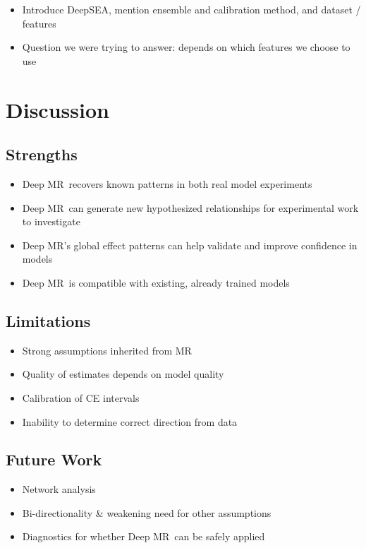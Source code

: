 \documentclass[twoside,11pt]{article}
\newcommand{\method}{{Deep MR}}
\begin{document}
\begin{itemize}
	\item Introduce DeepSEA, mention ensemble and calibration method, and dataset / features
	\item Question we were trying to answer: depends on which features we choose to use
\end{itemize}

\section{Discussion}%
\label{sec:discussion}

\subsection{Strengths}%
\label{sub:strengths}
\begin{itemize}
	\item \method\ recovers known patterns in both real model experiments
	\item \method\ can generate new hypothesized relationships for experimental work to investigate
	\item \method's global effect patterns can help validate and improve confidence in models
	\item \method\ is compatible with existing, already trained models 
\end{itemize}

\subsection{Limitations}%
\label{sub:limitations}
\begin{itemize}
	\item Strong assumptions inherited from MR
	\item Quality of estimates depends on model quality
	\item Calibration of CE intervals
	\item Inability to determine correct direction from data
\end{itemize}

\subsection{Future Work}%
\label{sub:future_work}
\begin{itemize}
	\item Network analysis
	\item Bi-directionality \& weakening need for other assumptions
	\item Diagnostics for whether \method\ can be safely applied
\end{itemize}
\end{document}
